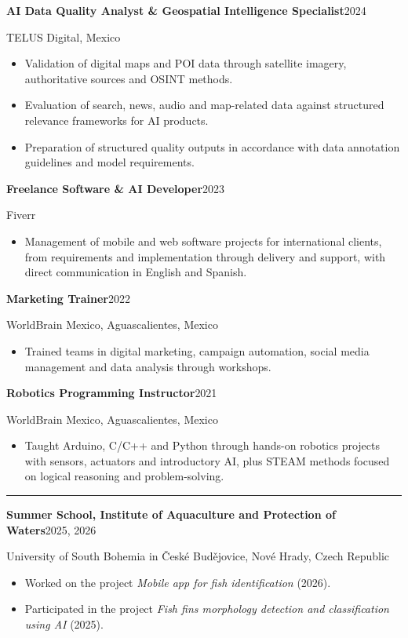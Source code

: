 \documentclass[10pt,a4paper]{article}
\newcommand{\cvsection}[1]{\par\vspace{7pt}{\large\textbf{\MakeUppercase{#1}}}\par\vspace{1pt}\hrule\vspace{4pt}}
\begin{document}
\textbf{AI Data Quality Analyst \& Geospatial Intelligence Specialist}\hfill 2024\par
TELUS Digital, Mexico\par
\begin{itemize}
\item Validation of digital maps and POI data through satellite imagery, authoritative sources and OSINT methods.
\item Evaluation of search, news, audio and map-related data against structured relevance frameworks for AI products.
\item Preparation of structured quality outputs in accordance with data annotation guidelines and model requirements.
\end{itemize}
\textbf{Freelance Software \& AI Developer}\hfill 2023\par
Fiverr\par
\begin{itemize}
\item Management of mobile and web software projects for international clients, from requirements and implementation through delivery and support, with direct communication in English and Spanish.
\end{itemize}
\textbf{Marketing Trainer}\hfill 2022\par
WorldBrain Mexico, Aguascalientes, Mexico\par
\begin{itemize}
\item Trained teams in digital marketing, campaign automation, social media management and data analysis through workshops.
\end{itemize}
\textbf{Robotics Programming Instructor}\hfill 2021\par
WorldBrain Mexico, Aguascalientes, Mexico\par
\begin{itemize}
\item Taught Arduino, C/C++ and Python through hands-on robotics projects with sensors, actuators and introductory AI, plus STEAM methods focused on logical reasoning and problem-solving.
\end{itemize}
\cvsection{Projects}
\textbf{Summer School, Institute of Aquaculture and Protection of Waters}\hfill 2025, 2026\par
University of South Bohemia in České Budějovice, Nové Hrady, Czech Republic\par
\begin{itemize}
\item Worked on the project \textit{Mobile app for fish identification} (2026).
\item Participated in the project \textit{Fish fins morphology detection and classification using AI} (2025).
\end{itemize}
\end{document}
